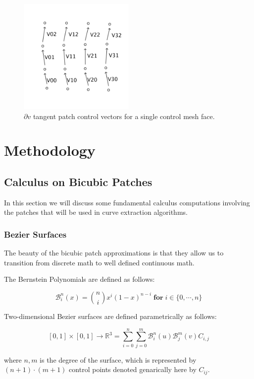\documentclass[12pt, letterpaper]{article}
\begin{document}
		\begin{figure}[h]
		\centering
		\includegraphics[width=0.5\textwidth]{dvPatch}
		\caption{$\partial v$ tangent patch control vectors for a single control mesh face.}
		\label{fig:dV}
		\end{figure}

\section{Methodology}

	\subsection{Calculus on Bicubic Patches}
	
	In this section we will discuss some fundamental calculus computations involving the patches that will be used in curve extraction algorithms.
	
		\subsubsection{Bezier Surfaces}
		The beauty of the bicubic patch approximations is that they allow us to transition from discrete math to well defined continuous math.
		
		The Bernstein Polynomials are defined as follows:
		
		$$\mathcal{B}_{i}^{n}(x) = \binom{n}{i}x^{i}(1-x)^{n-i} \; \textbf{for} \; i \in \{0, \cdots, n\}  $$
		
		Two-dimensional Bezier surfaces are defined parametrically as follows: 
		
		$$[0, 1] \times [0, 1] \rightarrow \mathbb{R}^{3} = \sum_{i=0}^{n}{\sum_{j=0}^{m}{\mathcal{B}_{i}^{n}(u) \mathcal{B}_{j}^{m}(v) C_{i, j}}}$$
		
		where $n, m$ is the degree of the surface, which is represented by $(n + 1) \cdot (m + 1)$ control points denoted genarically here by $C_{ij}$.
		
\end{document}
